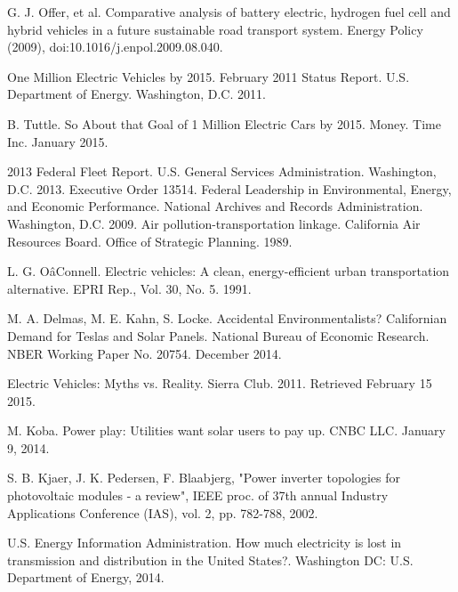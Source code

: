 \vspace{15mm}
\begin{thebibliography}{99}

 G. J. Offer, et al. Comparative analysis of battery electric, hydrogen fuel cell and hybrid vehicles in a future sustainable road transport system. Energy Policy (2009), doi:10.1016/j.enpol.2009.08.040.

 One Million Electric Vehicles by 2015. February 2011 Status Report. U.S. Department of Energy. Washington, D.C. 2011.




 B. Tuttle. So About that Goal of 1 Million Electric Cars by 2015. Money. Time Inc. January 2015.

 2013 Federal Fleet Report. U.S. General Services Administration. Washington, D.C. 2013.
 Executive Order 13514. Federal Leadership in Environmental, Energy, and Economic Performance. National Archives and Records Administration. Washington, D.C. 2009.
 Air pollution-transportation linkage. California Air Resources Board. Office of Strategic Planning. 1989.

 L. G. OâConnell. Electric vehicles: A clean, energy-efficient urban transportation alternative. EPRI Rep., Vol. 30, No. 5. 1991.


 M. A. Delmas, M. E. Kahn, S. Locke. Accidental Environmentalists? Californian Demand for Teslas and Solar Panels. National Bureau of Economic Research. NBER Working Paper No. 20754. December 2014.







 Electric Vehicles: Myths vs. Reality. Sierra Club. 2011. Retrieved February 15 2015.


 M. Koba. Power play: Utilities want solar users to pay up. CNBC LLC. January 9, 2014.

 S. B. Kjaer, J. K. Pedersen, F. Blaabjerg, "Power inverter topologies for photovoltaic modules - a review", IEEE proc. of 37th annual Industry Applications Conference (IAS), vol. 2, pp. 782-788, 2002. 

 U.S. Energy Information Administration. How much electricity is lost in transmission and distribution in the United States?. Washington DC: U.S. Department of Energy, 2014.










\end{thebibliography}
